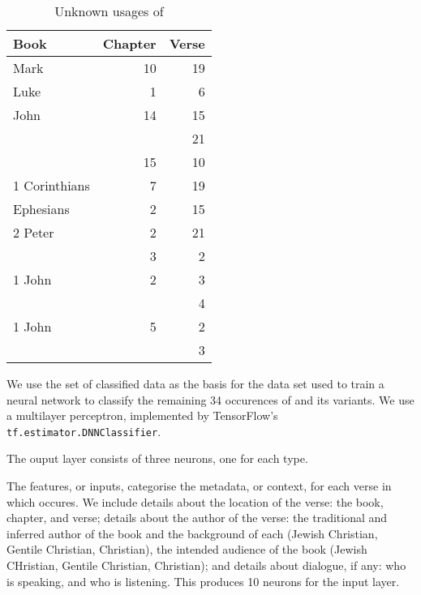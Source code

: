 \documentclass{article}
\newcommand{\entole}{\textepsilon\textnu\texttau\textomikron\textlambda\textepsilon\xspace}
\begin{document}
\begin{table}
    \centering
    \footnotesize
    \renewcommand\arraystretch{1}
    \begin{tabular}{lrr}
    \toprule
    Book & Chapter & Verse \\
    \midrule
    Mark & 10 & 19 \\
    Luke & 1 & 6 \\
    John & 14 & 15 \\
    & & 21 \\
    & 15 & 10 \\
    1 Corinthians & 7 & 19 \\
    Ephesians & 2 & 15 \\
    2 Peter & 2 & 21 \\
    & 3 & 2 \\
    1 John & 2 & 3\\
    & & 4\\
    1 John & 5 & 2\\
    & & 3\\
    \bottomrule
\end{tabular}
    \caption{Unknown usages of \entole}
    \label{unknown}
\end{table}

We use the set of classified data as the basis for the data set used to train a neural network to classify the remaining 34
occurences of \entole and its variants.  
We use a multilayer perceptron, implemented by TensorFlow's \texttt{tf.estimator.DNNClassifier}.

The ouput layer consists of three neurons, one for each type.

The features, or inputs, categorise the metadata, or context, for each verse in which \entole occures. 
We include details about the location of the verse: the book, chapter, and verse; details about the author of the verse:
the traditional and inferred author of the book and the background of each (Jewish Christian, Gentile Christian, Christian), 
the intended audience of the book (Jewish CHristian, Gentile Christian, Christian); and details about dialogue, if any:
who is speaking, and who is listening.  This produces 10 neurons for the input layer.
\end{document}
